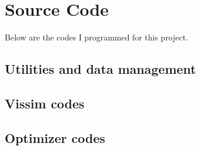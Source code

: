 \section{Source Code}
\label{code}
Below are the codes I programmed for this project.

\subsection{Utilities and data management}






\subsection{Vissim codes}













\subsection{Optimizer codes}




